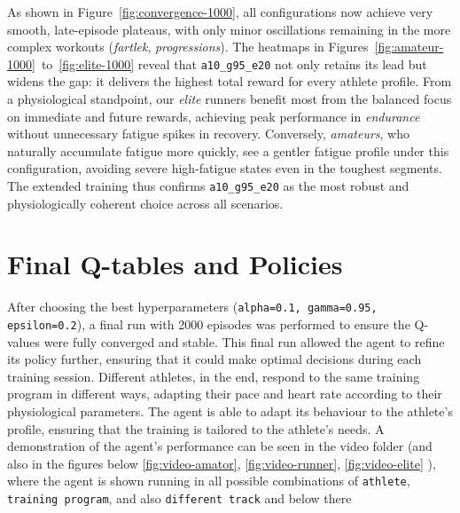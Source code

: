 As shown in Figure~\ref{fig:convergence-1000}, all configurations now achieve very smooth, late-episode plateaus, with only minor oscillations remaining in the more complex workouts (\textit{fartlek}, \textit{progressions}). The heatmaps in Figures~\ref{fig:amateur-1000}~to~\ref{fig:elite-1000} reveal that \texttt{a10\_g95\_e20} not only retains its lead but widens the gap: it delivers the highest total reward for every athlete profile. From a physiological standpoint, our \textit{elite} runners benefit most from the balanced focus on immediate and future rewards, achieving peak performance in \textit{endurance} without unnecessary fatigue spikes in recovery. Conversely, \textit{amateurs}, who naturally accumulate fatigue more quickly, see a gentler fatigue profile under this configuration, avoiding severe high-fatigue states even in the toughest segments. The extended training thus confirms \texttt{a10\_g95\_e20} as the most robust and physiologically coherent choice across all scenarios.

\section{Final Q-tables and Policies}
After choosing the best hyperparameters (\texttt{alpha=0.1, gamma=0.95, epsilon=0.2}), a final run with 2000 episodes was performed to ensure the Q-values were fully converged and stable. This final run allowed the agent to refine its policy further, ensuring that it could make optimal decisions during each training session.
Different athletes, in the end, respond to the same training program in different ways, adapting their pace and heart rate according to their physiological parameters. The agent is able to adapt its behaviour to the athlete's profile, ensuring that the training is tailored to the athlete's needs.
A demonstration of the agent's performance can be seen in the video folder (and also in the figures below \ref{fig:video-amator}, \ref{fig:video-runner}, \ref{fig:video-elite}  ), where the agent is shown running in all possible combinations of \texttt{athlete}, \texttt{training program}, and also \texttt{different track} and below there 

